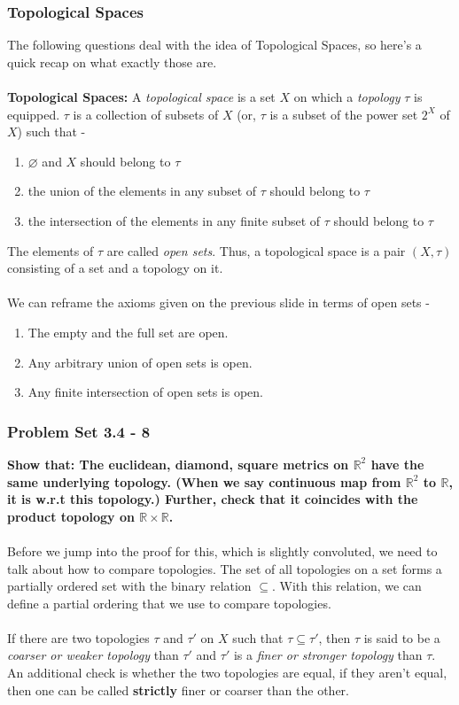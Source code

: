 \begin{frame}
    \frametitle{Topological Spaces}
    The following questions deal with the idea of Topological Spaces, so here's a quick recap on what exactly those are.\\\\
    \textbf{Topological Spaces:} A \textit{topological space} is a set $X$ on which a \textit{topology} $\tau$ is equipped. $\tau$ is a collection of subsets of $X$ (or, $\tau$ is a subset of the power set $2^{X}$ of $X$) such that -

    \begin{enumerate}
        \item $\varnothing$ and $X$ should belong to $\tau$
        \item the union of the elements in any subset of $\tau$ should belong to $\tau$
        \item the intersection of the elements in any finite subset of $\tau$ should belong to $\tau$
    \end{enumerate}
\end{frame}

\begin{frame}
    The elements of $\tau$ are called \textit{open sets}. Thus, a topological space is a pair $(X, \tau)$ consisting of a set and a topology on it.\\\\
    We can reframe the axioms given on the previous slide in terms of open sets - 
    \begin{enumerate}
        \item The empty and the full set are open.
        \item Any arbitrary union of open sets is open.
        \item Any finite intersection of open sets is open.
    \end{enumerate}
\end{frame}

\begin{frame}
    \frametitle{Problem Set 3.4 - 8}
    \textbf{Show that: The euclidean, diamond, square metrics on $\mathbb{R}^2$ have the same underlying topology. (When we say continuous map from $\mathbb{R}^2$ to $\mathbb{R}$, it is w.r.t this topology.) Further, check that it coincides with the product topology on $\mathbb{R} \times \mathbb{R}$.}\\\\
    Before we jump into the proof for this, which is slightly convoluted, we need to talk about how to compare topologies. The set of all topologies on a set forms a partially ordered set with the binary relation $\subseteq$. With this relation, we can define a partial ordering that we use to compare topologies. \\\\
    If there are two topologies $\tau$ and $\tau'$ on $X$ such that $\tau \subseteq \tau'$, then $\tau$ is said to be a \textit{coarser or weaker topology} than $\tau'$ and $\tau'$ is a \textit{finer or stronger topology} than $\tau$. An additional check is whether the two topologies are equal, if they aren't equal, then one can be called \textbf{strictly} finer or coarser than the other.
\end{frame}

